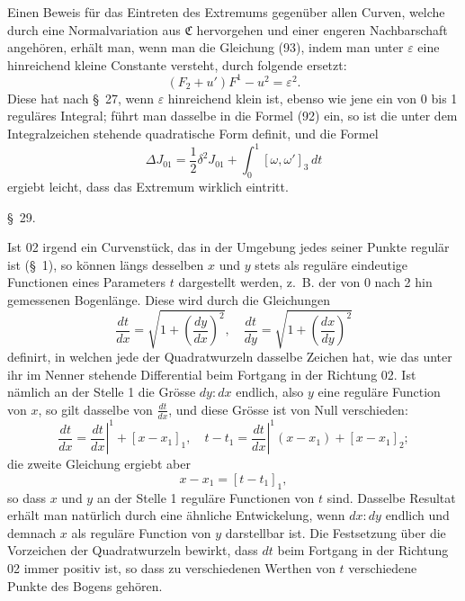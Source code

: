\documentclass[11pt,a4paper,leqno]{article}
\begin{document}
Einen Beweis für das Eintreten des Extremums gegenüber allen Curven, welche durch eine Normalvariation aus $\mathfrak C$ hervorgehen und einer engeren Nachbarschaft angehören, erhält man, wenn man die Gleichung (93), indem man unter $\varepsilon$ eine hinreichend kleine Constante versteht, durch folgende ersetzt:
\[
(F_2+u')F^1-u^2=\varepsilon^2.
\]
Diese hat nach \S~27, wenn $\varepsilon$ hinreichend klein ist, ebenso wie jene ein von 0 bis 1 reguläres Integral; führt man dasselbe in die Formel (92) ein, so ist die unter dem Integralzeichen stehende quadratische Form definit, und die Formel
\[
\Delta J_{01}=\frac12\delta^2J_{01}+\int_0^1[\omega,\omega']_3\,dt
\]
ergiebt leicht, dass das Extremum wirklich eintritt.

\begin{center}{\large \S~29.}\end{center}

Ist 02 irgend ein Curvenstück, das in der Umgebung jedes seiner Punkte regulär ist (\S~1), so können längs desselben $x$ und $y$ stets als reguläre eindeutige Functionen eines Parameters $t$ dargestellt werden, z.~B. der von 0 nach 2 hin gemessenen Bogenlänge. Diese wird durch die Gleichungen
\[
\frac{dt}{dx}=\sqrt{1+\left(\frac{dy}{dx}\right)^2},
\quad
\frac{dt}{dy}=\sqrt{1+\left(\frac{dx}{dy}\right)^2}
\]
definirt, in welchen jede der Quadratwurzeln dasselbe Zeichen hat, wie das unter ihr im Nenner stehende Differential beim Fortgang in der Richtung 02. Ist nämlich an der Stelle 1 die Grösse $dy:dx$ endlich, also $y$ eine reguläre Function von $x$, so gilt dasselbe von $\frac{dt}{dx}$, und diese Grösse ist von Null verschieden:
\[
\frac{dt}{dx}=\left.\frac{dt}{dx}\right|^1+[x-x_1]_1,
\quad
t-t_1=\left.\frac{dt}{dx}\right|^1(x-x_1)+[x-x_1]_2;
\]
die zweite Gleichung ergiebt aber
\[
x-x_1=[t-t_1]_1,
\]
so dass $x$ und $y$ an der Stelle 1 reguläre Functionen von $t$ sind. Dasselbe Resultat erhält man natürlich durch eine ähnliche Entwickelung, wenn $dx:dy$ endlich und demnach $x$ als reguläre Function von $y$ darstellbar ist. Die Festsetzung über die Vorzeichen der Quadratwurzeln bewirkt, dass $dt$ beim Fortgang in der Richtung 02 immer positiv ist, so dass zu verschiedenen Werthen von $t$ verschiedene Punkte des Bogens gehören.
\end{document}
